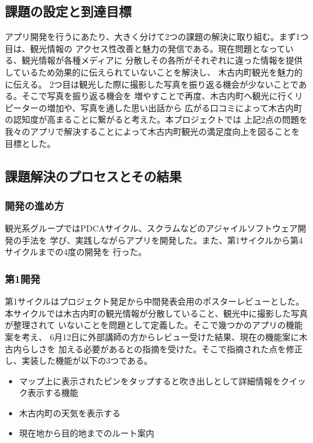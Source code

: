 \documentclass[twocolumn,draft]{jsarticle}
\begin{document}
\subsection{課題の設定と到達目標}
\begin{hissu}
アプリ開発を行うにあたり、大きく分けて2つの課題の解決に取り組む。まず1つ目は、観光情報の
アクセス性改善と魅力の発信である。現在問題となっている、観光情報が各種メディアに
分散しその各所がそれぞれに違った情報を提供しているため効果的に伝えられていないことを解決し、
木古内町観光を魅力的に伝える。
2つ目は観光した際に撮影した写真を振り返る機会が少ないことである。そこで写真を振り返る機会を
増やすことで再度、木古内町へ観光に行くリピーターの増加や、写真を通した思い出話から
広がる口コミによって木古内町の認知度が高まることに繋がると考えた。本プロジェクトでは
上記2点の問題を我々のアプリで解決することによって木古内町観光の満足度向上を図ることを
目標とした。
\end{hissu}
\subsection{課題解決のプロセスとその結果}
\subsubsection{開発の進め方}
\begin{hissu}
観光系グループではPDCAサイクル、スクラムなどのアジャイルソフトウェア開発の手法を
学び、実践しながらアプリを開発した。また、第1サイクルから第4サイクルまでの4度の開発を
行った。
\end{hissu}
\subsubsection{第1開発}
\begin{hissu}
第1サイクルはプロジェクト発足から中間発表会用のポスターレビューとした。
本サイクルでは木古内町の観光情報が分散していること、観光中に撮影した写真が整理されて
いないことを問題として定義した。そこで幾つかのアプリの機能案を考え、
6月12日に外部講師の方からレビュー受けた結果、現在の機能案に木古内らしさを
加える必要があるとの指摘を受けた。そこで指摘された点を修正し、実装した機能が以下の3つである。
\begin{itemize}
\item マップ上に表示されたピンをタップすると吹き出しとして詳細情報をクイック表示する機能
\item 木古内町の天気を表示する
\item 現在地から目的地までのルート案内
\end{itemize}
\end{hissu}
\end{document}
